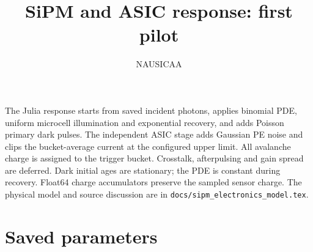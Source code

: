 \documentclass[10pt,a4paper]{article}
\title{SiPM and ASIC response: first pilot}
\author{NAUSICAA}\date{}
\providecommand{\SiPMGeneratedParameters}{}
\begin{document}
\maketitle
The Julia response starts from saved incident photons, applies binomial PDE,
uniform microcell illumination and exponential recovery, and adds Poisson
primary dark pulses. The independent ASIC stage adds Gaussian PE noise and
clips the bucket-average current at the configured upper limit. All avalanche
charge is assigned to the trigger bucket. Crosstalk, afterpulsing and gain
spread are deferred. Dark initial ages are stationary; the PDE is constant
during recovery. Float64 charge accumulators preserve the sampled sensor charge.
The physical model and source discussion are in \texttt{docs/sipm\_electronics\_model.tex}.
\section{Saved parameters}
\begin{center}\SiPMGeneratedParameters\end{center}

\end{document}
